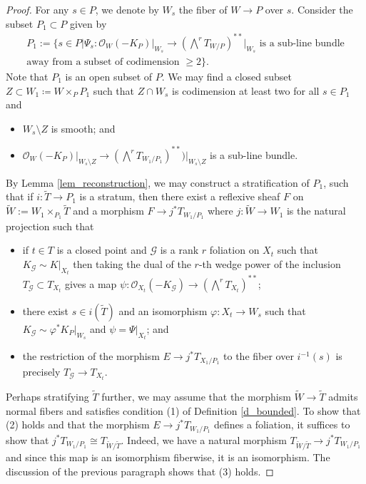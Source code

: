 \documentclass[12pt]{amsart}
\numberwithin{equation}{section}
\theoremstyle{definition}
\theoremstyle{definition}
\theoremstyle{definition}
\begin{document}
\begin{proof}
For any $s\in P$, we denote by $W_s$ the fiber of $W\to P$ over $s$. Consider the subset $P_1 \subset P$ given by 
\begin{align*}
P_1 :=\Bigg\{s \in P\Bigg| \Psi_s\colon \mathcal O_{W}(-K_P)\vert_{W_s} \to \left(\bigwedge^rT_{W/P}\right)^{**}\Bigg\vert_{W_s} \text{ is a sub-line bundle} \\  \text{away from a subset of codimension } \ge 2\Bigg\}.
\end{align*}
Note that $P_1$ is an open subset of $P$.
We may find a closed subset $Z \subset W_1\coloneqq W\times_PP_1$ such that $Z \cap W_s$ is codimension at least two for all $s \in P_1$ and 
\begin{itemize}
    \item $W_s \setminus Z$ is smooth; and 
    \item $\mathcal O_{W}(-K_P)\vert_{W_s\setminus Z} \to (\bigwedge^rT_{W_1/P_1})^{**})\vert_{W_s\setminus Z}$
    is a sub-line bundle.
    \end{itemize}
By Lemma \ref{lem_reconstruction}, we may construct a  stratification of $P_1$,
such that
 if $i\colon \tilde{T} \to P_1$ is a stratum, then there exist 
 a reflexive sheaf $F$ on $\tilde{W} := W_1\times_{P_1}\tilde{T}$
and a  morphism $F \to j^*T_{W_1/P_1}$
where $j\colon \tilde{W} \to W_1$ is the natural projection  such that 
\begin{itemize}
\item if $t \in T$ is a closed point and $\mathcal G$ is a rank $r$ foliation on $X_t$ such that
 $K_{\mathcal G} \sim K\vert_{X_t}$ then
taking the dual of the $r$-th wedge power 
of the inclusion $T_{\mathcal G} \subset T_{X_t}$ gives a map $\psi \colon \mathcal O_{X_t}(-K_{\mathcal G}) \to (\bigwedge^rT_{X_t})^{**}$; 
\item there exist $s \in i(\tilde T)$ and an isomorphism $\varphi\colon X_t\to W_s$ such that $K_{\mathcal G}\sim \varphi^*K_P\vert_{W_s}$ and $\psi = \Psi\vert_{X_t}$; and
\item  the restriction of the morphism 
$E \to j^*T_{X_1/P_1}$ to the fiber over $i^{-1}(s)$
 is precisely $T_{\mathcal G} \to T_{X_t}$.
\end{itemize}


Perhaps stratifying $\tilde{T}$ further, we may assume that the morphism 
$\tilde{W} \to \tilde{T}$ admits normal fibers and satisfies condition (1) of Definition \ref{d_bounded}.
To show that (2) holds and that the morphism $E \to j^*T_{W_1/P_1}$ defines a foliation, it suffices to show that
$j^*T_{W_1/P_1} \cong T_{\tilde{W}/\tilde{T}}$. Indeed, we have a natural morphism $T_{\tilde{W}/\tilde{T}} \to j^*T_{W_1/P_1}$ and since this map is an isomorphism fiberwise, it is an isomorphism.
The discussion of the previous paragraph shows that (3) holds.
\end{proof}
\end{document}
